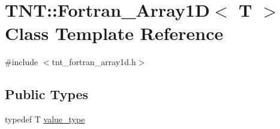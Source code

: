 \hypertarget{classTNT_1_1Fortran__Array1D}{\section{T\-N\-T\-:\-:Fortran\-\_\-\-Array1\-D$<$ T $>$ Class Template Reference}
\label{classTNT_1_1Fortran__Array1D}
}


{\ttfamily \#include $<$tnt\-\_\-fortran\-\_\-array1d.\-h$>$}

\subsection*{Public Types}
\begin{DoxyCompactItemize}
\item 
typedef T \hyperlink{classTNT_1_1Fortran__Array1D_af213c3571890bd98e08eb5e93e100a1a}{value\-\_\-type}
\end{DoxyCompactItemize}
